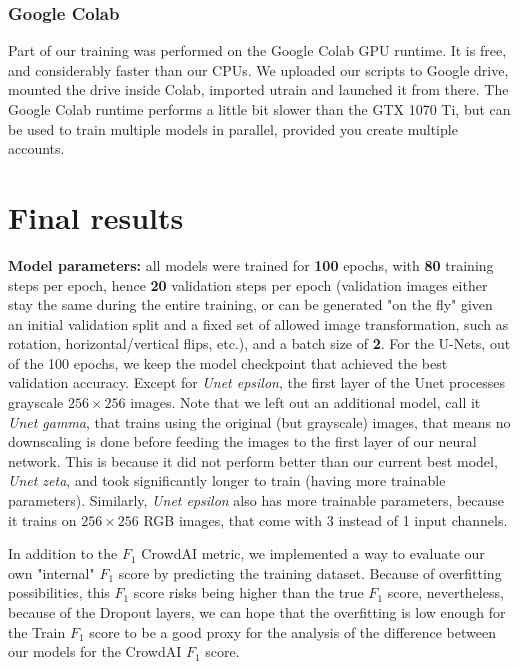 \documentclass[10pt,conference,compsocconf]{IEEEtran}
\begin{document}
\subsubsection{Google Colab}
Part of our training was performed on the Google Colab GPU runtime. It is free, and considerably faster than our CPUs. We uploaded our scripts to Google drive, mounted the drive inside Colab, imported utrain and launched it from there. The Google Colab runtime performs a little bit slower than the GTX 1070 Ti, but can be used to train multiple models in parallel, provided you create multiple accounts.

\section{Final results}

\noindent
\textbf{Model parameters:} all models were trained for \textbf{100} epochs, with \textbf{80} training steps per epoch, hence \textbf{20} validation steps per epoch (validation images either stay the same during the entire training, or can be generated "on the fly" given an initial validation split and a fixed set of allowed image transformation, such as rotation, horizontal/vertical flips, etc.), and a batch size of \textbf{2}. For the U-Nets, out of the 100 epochs, we keep the model checkpoint that achieved the best validation accuracy. Except for \textit{Unet epsilon}, the first layer of the Unet processes grayscale $256 \times 256$ images. Note that we left out an additional model, call it \textit{Unet gamma}, that trains using the original (but grayscale) images, that means no downscaling is done before feeding the images to the first layer of our neural network. This is because it did not perform better than our current best model, \textit{Unet zeta}, and took significantly longer to train (having more trainable parameters). Similarly, \textit{Unet epsilon} also has more trainable parameters, because it trains on $256 \times 256$ RGB images, that come with 3 instead of 1 input channels. 

In addition to the $F_1$ CrowdAI metric, we implemented a way to evaluate our own "internal" $F_1$ score by predicting the training dataset. Because of overfitting possibilities, this $F_1$ score risks being higher than the true $F_1$ score, nevertheless, because of the Dropout layers, we can hope that the overfitting is low enough for the Train $F_1$ score to be a good proxy for the analysis of the difference between our models for the CrowdAI $F_1$ score.
\end{document}
